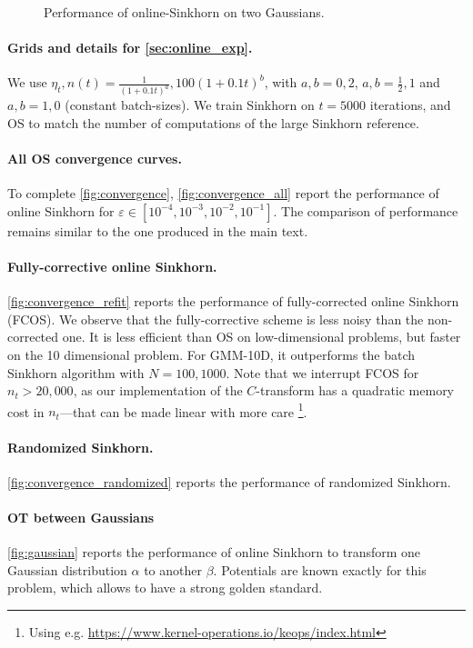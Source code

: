 \begin{figure}[t]
    \caption{Performance of online-Sinkhorn on two Gaussians.}
    \label{fig:gaussian}
\end{figure}

\paragraph{Grids and details for \autoref{sec:online_exp}.} We use $\eta_t, n(t)
= \frac{1}{(1 + 0.1t)^a}, 100 (1 + 0.1t)^{b}$, with $a, b = 0, 2$, $a, b =
\frac{1}{2}, 1$ and $a,b =1, 0$ (constant batch-sizes). We train Sinkhorn on $t
= 5000$ iterations, and OS to match the number of computations of the large
Sinkhorn reference.

\paragraph{All OS convergence curves.} To complete \autoref{fig:convergence}, \autoref{fig:convergence_all} report the
performance of online Sinkhorn for $\varepsilon \in [10^{-4}, 10^{-3}, 10^{-2},
10^{-1}]$. The comparison of performance remains similar to the one produced in the main text.

\paragraph{Fully-corrective online Sinkhorn.}\autoref{fig:convergence_refit} reports the performance of
fully-corrected online Sinkhorn (FCOS). We observe that the fully-corrective scheme is less noisy than the
non-corrected one. It is less efficient than OS on low-dimensional problems,
but faster on the 10 dimensional problem. For GMM-10D, it outperforms the batch Sinkhorn algorithm
with $N=100, 1000$. Note that we interrupt FCOS for $n_t > 20,000$, as our implementation of the $C$-transform has a quadratic memory cost in $n_t$---that can be made linear with more care \footnote{Using e.g. \url{https://www.kernel-operations.io/keops/index.html}}.

\paragraph{Randomized Sinkhorn.}\autoref{fig:convergence_randomized} reports
the performance of randomized Sinkhorn.

\paragraph{OT between Gaussians}\autoref{fig:gaussian} reports the performance of online Sinkhorn to transform one Gaussian distribution $\alpha$ to another $\beta$. Potentials are known exactly for this problem, which allows to have a strong golden standard.

